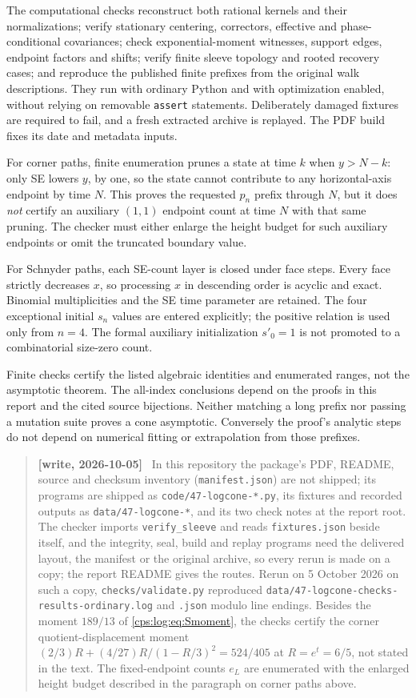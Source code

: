 \documentclass[11pt,letterpaper]{article}
\numberwithin{equation}{section}
\theoremstyle{remark}\newtheorem{remark}[theorem]{Remark}
\newenvironment{writenotelog}{\begin{quote}\small\sloppy\textbf{[write, 2026-10-05]}\ }{\end{quote}}
\begin{document}
The computational checks reconstruct both rational kernels and their
normalizations; verify stationary centering, correctors, effective and
phase-conditional covariances; check exponential-moment witnesses,
support edges, endpoint factors and shifts; verify finite sleeve topology and rooted recovery cases; and reproduce the
published finite prefixes from the original walk descriptions.
They run with ordinary Python and with optimization enabled, without
relying on removable \texttt{assert} statements. Deliberately damaged
fixtures are required to fail, and a fresh extracted archive is
replayed. The PDF build fixes its date and metadata inputs.

For corner paths, finite enumeration prunes a state at time $k$ when
$y>N-k$: only SE lowers $y$, by one, so the state cannot contribute
to any horizontal-axis endpoint by time $N$. This proves the requested
$p_n$ prefix through $N$, but it does \emph{not} certify an auxiliary
$(1,1)$ endpoint count at time $N$ with that same pruning. The checker
must either enlarge the height budget for such auxiliary endpoints
or omit the truncated boundary value.

For Schnyder paths, each SE-count layer is closed under face steps.
Every face strictly decreases $x$, so processing $x$ in descending
order is acyclic and exact. Binomial multiplicities and the SE time
parameter are retained. The four exceptional initial $s_n$ values
are entered explicitly; the positive relation is used only from
$n=4$. The formal auxiliary initialization $s'_0=1$ is not promoted
to a combinatorial size-zero count.

Finite checks certify the listed algebraic identities and enumerated
ranges, not the asymptotic theorem. The all-index conclusions depend
on the proofs in this report and the cited source bijections. Neither
matching a long prefix nor passing a mutation suite proves a cone
asymptotic. Conversely the proof's analytic steps do not depend on
numerical fitting or extrapolation from those prefixes.

\begin{writenotelog}
In this repository the package's PDF, README, source and checksum inventory
(\texttt{manifest.json}) are not shipped; its programs are shipped as
\texttt{code/47-logcone-*.py}, its fixtures and recorded outputs as \texttt{data/47-logcone-*}, and
its two check notes at the report root. The checker imports \texttt{verify\_sleeve} and reads
\texttt{fixtures.json} beside itself, and the integrity, seal, build and replay programs need the
delivered layout, the manifest or the original archive, so every rerun is made on a copy; the
report README gives the routes. Rerun on 5 October 2026 on such a copy, \texttt{checks/validate.py}
reproduced \texttt{data/47-logcone-checks-results-ordinary.log} and \texttt{.json} modulo line
endings. Besides the moment $189/13$ of \eqref{cps:log:eq:Smoment}, the checks certify the corner
quotient-displacement moment $(2/3)R+(4/27)R/(1-R/3)^2=524/405$ at $R=e^t=6/5$, not stated in the
text. The fixed-endpoint counts $e_L$ are enumerated with the enlarged height budget described
in the paragraph on corner paths above.
\end{writenotelog}
\end{document}
